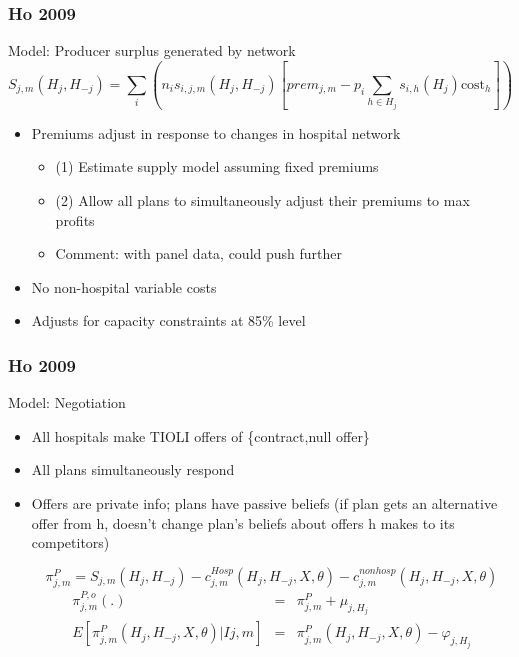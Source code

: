 \documentclass[notes=show]{beamer}
\begin{document}
\begin{frame}
\frametitle{Ho 2009}

Model: Producer surplus generated by network
\[
S_{j,m}(H_{j},H_{-j})=\sum%
\limits_{i}(n_{i}s_{i,j,m}(H_{j},H_{-j})[prem_{j,m}-p_{i}\sum \limits_{h\in
H_{j}}s_{i,h}(H_{j})\text{cost}_{h}])
\]

\begin{itemize}
\item Premiums adjust in response to changes in hospital network
\begin{itemize}
\item (1) Estimate supply model assuming fixed premiums
\item (2) Allow all plans to simultaneously adjust their premiums to max profits
\item Comment: with panel data, could push further
\end{itemize}
\item No non-hospital variable costs
\item Adjusts for capacity constraints at 85\% level

\end{itemize}

\end{frame}

\begin{frame}
\frametitle{Ho 2009}

Model: Negotiation
\begin{itemize}
\item All hospitals make TIOLI offers of \{contract,null offer\}
\item All plans simultaneously respond
\item Offers are private info; plans have passive beliefs (if plan gets an alternative offer from h, doesn't change plan's beliefs about offers h makes to its competitors)

\[
\pi _{j,m}^{P} =S_{j,m}(H_{j},H_{-j})-c_{j,m}^{Hosp}(H_{j},H_{-j},X,\theta
)-c_{j,m}^{nonhosp}(H_{j},H_{-j},X,\theta )
\]
\begin{eqnarray*}
\pi _{j,m}^{P,o}(.) &=&\pi _{j,m}^{P}+\mu _{j,H_{j}} \\
E[\pi _{j,m}^{P}(H_{j},H_{-j},X,\theta )|Ij,m] &=&\pi
_{j,m}^{P}(H_{j},H_{-j},X,\theta )-\varphi _{j,H_{j}}
\end{eqnarray*}

\end{itemize}

\end{frame}
\end{document}
